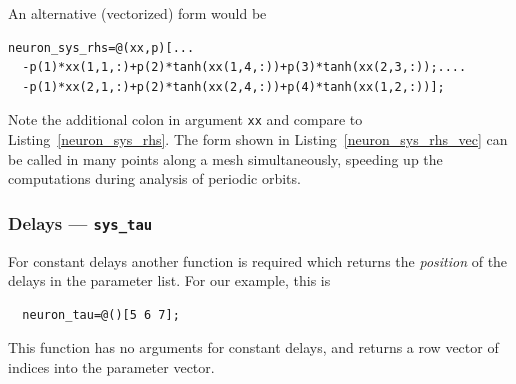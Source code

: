 \documentclass[10pt]{scrartcl}
\newcommand{\blist}[1]{\mbox{\lstinline!#1!}}
\begin{document}
An alternative (vectorized) form would be
\begin{lstlisting}[frame=lines,label=neuron_sys_rhs_vec,caption={Alternative definition of the right-hand side of \eqref{example_sys}, vectorized for speed-up of periodic orbit computations.}]
  neuron_sys_rhs=@(xx,p)[...
  -p(1)*xx(1,1,:)+p(2)*tanh(xx(1,4,:))+p(3)*tanh(xx(2,3,:));....
  -p(1)*xx(2,1,:)+p(2)*tanh(xx(2,4,:))+p(4)*tanh(xx(1,2,:))];
\end{lstlisting}
Note the additional colon in argument \blist{xx} and compare to
Listing~\ref{neuron_sys_rhs}. The form shown in
Listing~\ref{neuron_sys_rhs_vec} can be called in many points along a
mesh simultaneously, speeding up the computations during analysis of
periodic orbits.

\subsubsection{Delays --- \blist{sys_tau}} \label{sec:consttau}
For constant delays another function is required which returns the
\emph{position} of the delays in the parameter list. For our example,
this is
\begin{lstlisting}
  neuron_tau=@()[5 6 7];
\end{lstlisting}
This function has no arguments for constant delays, and returns a row
vector of indices into the parameter vector.
\end{document}
